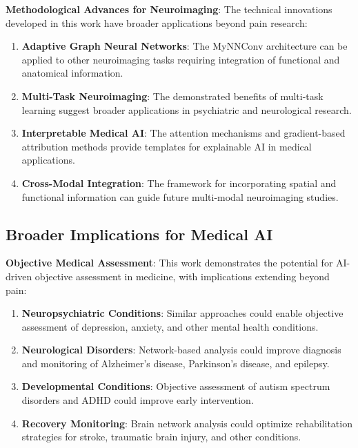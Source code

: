 \textbf{Methodological Advances for Neuroimaging}:
The technical innovations developed in this work have broader applications beyond pain research:

\begin{enumerate}
\item \textbf{Adaptive Graph Neural Networks}: The MyNNConv architecture can be applied to other neuroimaging tasks requiring integration of functional and anatomical information.

\item \textbf{Multi-Task Neuroimaging}: The demonstrated benefits of multi-task learning suggest broader applications in psychiatric and neurological research.

\item \textbf{Interpretable Medical AI}: The attention mechanisms and gradient-based attribution methods provide templates for explainable AI in medical applications.

\item \textbf{Cross-Modal Integration}: The framework for incorporating spatial and functional information can guide future multi-modal neuroimaging studies.
\end{enumerate}

\subsection{Broader Implications for Medical AI}

\textbf{Objective Medical Assessment}:
This work demonstrates the potential for AI-driven objective assessment in medicine, with implications extending beyond pain:

\begin{enumerate}
\item \textbf{Neuropsychiatric Conditions}: Similar approaches could enable objective assessment of depression, anxiety, and other mental health conditions.

\item \textbf{Neurological Disorders}: Network-based analysis could improve diagnosis and monitoring of Alzheimer's disease, Parkinson's disease, and epilepsy.

\item \textbf{Developmental Conditions}: Objective assessment of autism spectrum disorders and ADHD could improve early intervention.

\item \textbf{Recovery Monitoring}: Brain network analysis could optimize rehabilitation strategies for stroke, traumatic brain injury, and other conditions.
\end{enumerate}

